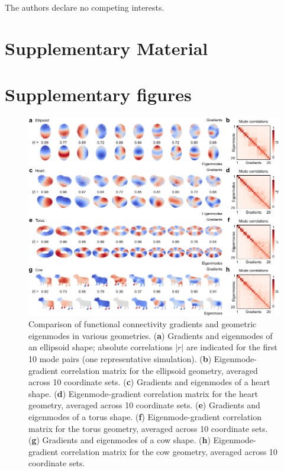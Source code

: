 \documentclass{article}
\begin{document}
The authors declare no competing interests. 

\newpage



\section*{Supplementary Material}

\section*{Supplementary figures}

\renewcommand{\thefigure}{S\arabic{figure}}
\addtocounter{figure}{-7}

\begin{figure}[h]
    \centering
    \includegraphics[width=1.0\linewidth]{figures/supp_geometries.pdf}
    \caption{Comparison of functional connectivity gradients and geometric eigenmodes in various geometries. (\textbf{a}) Gradients and eigenmodes of an ellipsoid shape; absolute correlations $|r|$ are indicated for the first 10 mode pairs (one representative simulation). (\textbf{b}) Eigenmode-gradient correlation matrix for the ellipsoid geometry, averaged across 10 coordinate sets. (\textbf{c}) Gradients and eigenmodes of a heart shape. (\textbf{d}) Eigenmode-gradient correlation matrix for the heart geometry, averaged across 10 coordinate sets. (\textbf{e}) Gradients and eigenmodes of a torus shape. (\textbf{f}) Eigenmode-gradient correlation matrix for the torus geometry, averaged across 10 coordinate sets. (\textbf{g}) Gradients and eigenmodes of a cow shape. (\textbf{h}) Eigenmode-gradient correlation matrix for the cow geometry, averaged across 10 coordinate sets.}
    \label{supp_geometries}
\end{figure}
\end{document}

